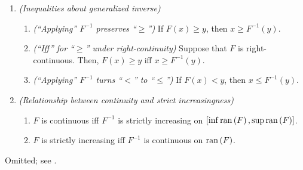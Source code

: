 \begin{enumerate}
\begin{enumerate}
\begin{enumerate}
\end{enumerate}
\item \emph{(Inequalities about generalized inverse)}
\begin{enumerate}
\item \emph{(``Applying'' \(F^{-1}\) preserves ``\(\ge\)'')} If \(F(x)\ge y\), then \(x\ge F^{-1}(y)\).
\item \emph{(``Iff'' for ``\(\ge\)'' under right-continuity)} Suppose that
\(F\) is right-continuous. Then, \(F(x)\ge y\) iff \(x\ge F^{-1}(y)\).
\item \emph{(``Applying'' \(F^{-1}\) turns ``\(<\)'' to ``\(\le\)'')} If \(F(x)<y\), then \(x\le F^{-1}(y)\).
\end{enumerate}
\item \emph{(Relationship between continuity and strict increasingness)}
\begin{enumerate}
\item \(F\) is continuous iff \(F^{-1}\) is strictly increasing on \([\inf\operatorname{ran}\left(F\right),\sup\operatorname{ran}\left(F\right)]\).
\item \(F\) is strictly increasing iff \(F^{-1}\) is continuous on \(\operatorname{ran}\left(F\right)\).
\end{enumerate}
\end{enumerate}
\begin{pf}
Omitted; see \textcite{embrechts2013note}.
\end{pf}
\end{enumerate}
